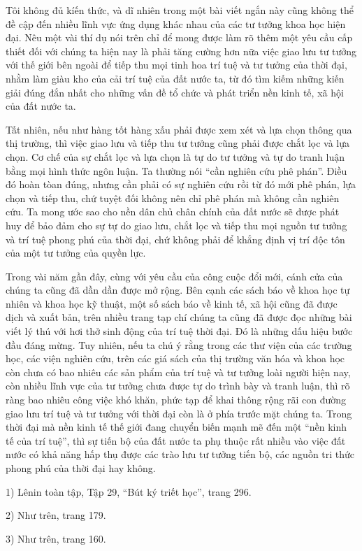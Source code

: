 Tôi không đủ kíến thức, và dĩ nhiên trong một bài viết ngắn này cũng không thể đề cập đến nhiều lĩnh vực ứng dụng khác nhau của các tư tưởng khoa học hiện đại. Nêu một vài thí dụ nói trên chỉ để mong được làm rõ thêm một yêu cầu cấp thiết đối với chúng ta hiện nay là phải tăng cường hơn nữa việc giao lưu tư tưởng với thế giới bên ngoài để tiếp thu mọi tinh hoa trí tuệ và tư tưởng của thời đại, nhằm làm giàu kho của cải trí tuệ của đất nước ta, từ đó tìm kiếm những kiến giải đúng đắn nhất cho những vấn đề tổ chức và phát triển nền kinh tế, xã hội của đất nước ta.

Tất nhiên, nếu như hàng tốt hàng xấu phải được xem xét và lựa chọn thông qua thị trường, thì việc giao lưu và tiếp thu tư tưởng cũng phải được chắt lọc và lựa chọn. Cơ chế của sự chắt lọc và lựa chọn là tự do tư tưởng và tự do tranh luận bằng mọi hình thức ngôn luận. Ta thường nói “cần nghiên cứu phê phán”. Điều đó hoàn tòan đúng, nhưng cần phải có sự nghiên cứu rồi từ đó mới phê phán, lựa chọn và tiếp thu, chứ tuyệt đối không nên chỉ phê phán mà không cần nghiên cứu. Ta mong ước sao cho nền dân chủ chân chính của đất nước sẽ được phát huy để bảo đảm cho sự tự do giao lưu, chắt lọc và tiếp thu mọi nguồn tư tưởng và trí tuệ phong phú của thời đại, chứ không phải để khẳng định vị trí độc tôn của một tư tưởng của quyền lực.

Trong vài năm gần đây, cùng với yêu cầu của công cuộc đổi mới, cánh cửa của chúng ta cũng đã dần dần được mở rộng. Bên cạnh các sách báo về khoa học tự nhiên và khoa học kỹ thuật, một số sách báo về kinh tế, xã hội cũng đã được dịch và xuất bản, trên nhiều trang tạp chí chúng ta cũng đã được đọc những bài viết lý thú với hơi thở sinh động của trí tuệ thời đại. Đó là những dấu hiệu bước đầu đáng mừng. Tuy nhiên, nếu ta chú ý rằng trong các thư viện của các trường học, các viện nghiên cứu, trên các giá sách của thị trường văn hóa và khoa học còn chưa có bao nhiêu các sản phẩm của trí tuệ và tư tưởng loài người hiện nay, còn nhiều lĩnh vực của tư tưởng chưa được tự do trình bày và tranh luận, thì rõ ràng bao nhiêu công việc khó khăn, phức tạp để khai thông rộng rãi con đường giao lưu trí tuệ và tư tưởng với thời đại còn là ở phía trước mặt chúng ta. Trong thời đại mà nền kinh tế thế giới đang chuyển biến mạnh mẽ đến một “nền kinh tế của trí tuệ”, thì sự tiến bộ của đất nước ta phụ thuộc rất nhiều vào việc đất nước có khả năng hấp thụ được các trào lưu tư tưởng tiến bộ, các nguồn tri thức phong phú của thời đại hay không.

1) Lênin toàn tập, Tập 29, “Bút ký triết học”, trang 296.

2) Như trên, trang 179.

3) Như trên, trang 160.